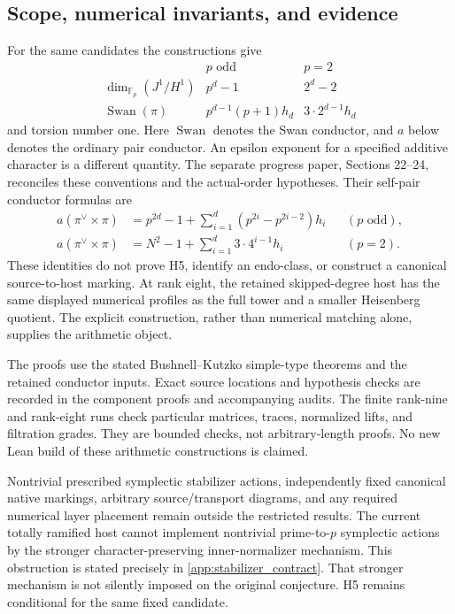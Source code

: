 \documentclass[11pt]{amsart}
\theoremstyle{definition}
\theoremstyle{remark}
\newcommand{\FF}{\mathbb F}
\newcommand{\Swan}{\operatorname{Swan}}
\begin{document}
\subsection{Scope, numerical invariants, and evidence}

For the same candidates the constructions give
\[
\begin{array}{c|c|c}
 & p\text{ odd} & p=2\\ \hline
\dim_{\FF_p}(J^1/H^1) & p^d-1 & 2^d-2\\
\Swan(\pi)&p^{d-1}(p+1)h_d&3\cdot2^{d-1}h_d
\end{array}
\]
and torsion number one. Here \(\Swan\) denotes the Swan conductor,
and \(a\) below denotes the ordinary pair conductor. An epsilon exponent
for a specified additive character is a different quantity. The separate
progress paper, Sections 22--24, reconciles these conventions and the
actual-order hypotheses. Their self-pair conductor formulas are
\[
\begin{aligned}
a(\pi^\vee\times\pi)
 &=p^{2d}-1+\sum_{i=1}^d(p^{2i}-p^{2i-2})h_i
 &&(p\text{ odd}),\\
a(\pi^\vee\times\pi)
 &=N^2-1+\sum_{i=1}^d3\cdot4^{i-1}h_i
 &&(p=2).
\end{aligned}
\]
These identities do not prove H5, identify an endo-class, or construct
a canonical source-to-host marking. At rank eight, the retained
skipped-degree host has the same displayed numerical profiles as the
full tower and a smaller Heisenberg quotient. The explicit construction,
rather than numerical matching alone, supplies the arithmetic object.

The proofs use the stated Bushnell--Kutzko simple-type theorems
\cite{BushnellKutzko1993} and the retained conductor inputs. Exact source
locations and hypothesis checks are recorded in the component proofs
and accompanying audits. The finite rank-nine and rank-eight runs check
particular matrices, traces, normalized lifts, and filtration grades.
They are bounded checks, not arbitrary-length proofs. No new Lean build
of these arithmetic constructions is claimed.

Nontrivial prescribed symplectic stabilizer actions, independently fixed
canonical native markings, arbitrary source/transport diagrams, and any
required numerical layer placement remain outside the restricted results.
The current totally ramified host cannot implement nontrivial
prime-to-\(p\) symplectic actions by the stronger character-preserving
inner-normalizer mechanism. This obstruction is stated precisely in
\cref{app:stabilizer_contract}. That stronger mechanism is not silently
imposed on the original conjecture. H5 remains conditional for the same
fixed candidate.
\end{document}
